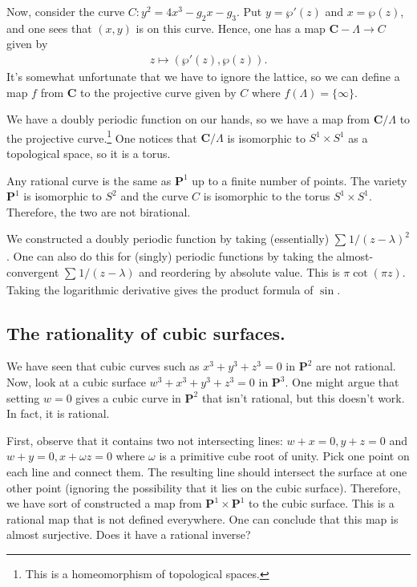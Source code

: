 \documentclass [11 pt, oneside] {article}
\begin{document}
Now, consider the curve $C:y^2 = 4x^3 - g_2x-g_3$. Put $y=\wp'(z)$ and $x=\wp(z)$, and one sees that $(x,y)$ is on this curve. Hence, one has a map $\mathbf{C}-\Lambda \longrightarrow C$ given by
\begin{align*}
	z\longmapsto (\wp'(z),\wp (z)).
\end{align*}
It's somewhat unfortunate that we have to ignore the lattice, so we can define a map $f$ from $\mathbf{C}$ to the projective curve given by $C$ where $f(\Lambda) = \{\infty\}$. 

We have a doubly periodic function on our hands, so we have a map from $\mathbf{C}/\Lambda$ to the projective curve.\footnote{This is a homeomorphism of topological spaces.} One notices that $\mathbf{C}/\Lambda$ is isomorphic to $S^1\times S^1$ as a topological space, so it is a torus.

Any rational curve is the same as $\mathbf{P}^1$ up to a finite number of points. The variety $\mathbf{P}^1$ is isomorphic to $S^2$ and the curve $C$ is isomorphic to the torus $S^1\times S^1$. Therefore, the two are not birational.

\begin{remark}
	We constructed a doubly periodic function by taking (essentially) $\sum_{}^{} 1/(z-\lambda)^2 $. One can also do this for (singly) periodic functions by taking the almost-convergent $\sum_{}^{} 1/(z-\lambda)$ and reordering by absolute value. This is $\pi\cot (\pi z)$. Taking the logarithmic derivative gives the product formula of $\sin$.
\end{remark}

\subsection{The rationality of cubic surfaces.}
We have seen that cubic curves such as $x^3+y^3+z^3=0$ in $\mathbf{P}^2$ are not rational. Now, look at a cubic surface $w^3+x^3+y^3+z^3= 0$ in $\mathbf{P}^3$. One might argue that setting $w=0$ gives a cubic curve in $\mathbf{P}^2$ that isn't rational, but this doesn't work. In fact, it is rational.

First, observe that it contains two not intersecting lines: $w+x=0, y+z=0$ and $w+y=0, x+\omega z=0$ where $\omega$ is a primitive cube root of unity. Pick one point on each line and connect them. The resulting line should intersect the surface at one other point (ignoring the possibility that it lies on the cubic surface). Therefore, we have sort of constructed a map from $\mathbf{P}^1\times \mathbf{P}^1$ to the cubic surface. This is a rational map that is not defined everywhere. One can conclude that this map is almost surjective. Does it have a rational inverse?
\end{document}
